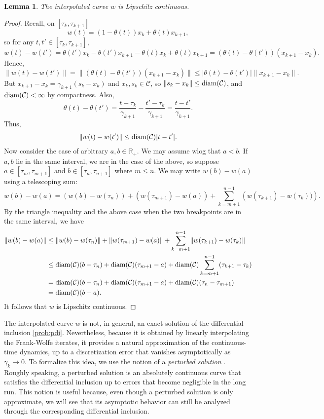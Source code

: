 \documentclass[pdflatex,sn-mathphys-num]{sn-jnl}%
\newcommand\diam{\mathop{\rm diam}}
\newcommand\R{\mathbb{R}}
\newcommand\C{\mathcal{C}}
\theoremstyle{thmstyleone}%
\newtheorem{lemma}[theorem]{Lemma}%
\theoremstyle{thmstyletwo}%
\theoremstyle{thmstylethree}%
\begin{document}
\begin{lemma} \label{lem:lipschitz-w}
  The interpolated curve $w$ is Lipschitz continuous.
\end{lemma}
\begin{proof}
  Recall, on $[\tau_k, \tau_{k+1}]$
  \[
    w(t) = (1-\theta(t))x_k + \theta(t)x_{k+1},
  \]
  so for any $t,t' \in [\tau_k,\tau_{k+1}]$,
  \[
    w(t) - w(t') = \theta(t')x_k - \theta(t')x_{k+1} - \theta(t) x_k + \theta(t)x_{k+1} = \left(\theta(t) - \theta(t')\right)(x_{k+1} - x_k).
  \]
  Hence,
  \[
    \lVert w(t) - w(t')\rVert = \lVert\left(\theta(t) - \theta(t')\right)(x_{k+1} - x_k)\rVert \leq \lvert\theta(t) - \theta(t')\rvert\lVert x_{k+1} - x_k\rVert.
  \]
  But $x_{k+1} - x_k = \gamma_{k+1}(s_k - x_k)$ and $x_k,s_k \in \C$, so $\lVert s_k - x_k\rVert \leq \diam(\C)$, and $\diam(\C) < \infty$ by compactness.
  Also,
  \[
    \theta(t) - \theta(t') = \frac{t - \tau_k}{\gamma_{k+1}} - \frac{t' - \tau_k}{\gamma_{k+1}} = \frac{t-t'}{\gamma_{k+1}}.
  \]
  Thus,
  \[
    \lVert w(t) - w(t')\rVert \leq \diam(\C)\lvert t - t'\rvert.
  \]
  Now consider the case of arbitrary $a,b \in \R_+$. We may assume wlog that $a < b$. If $a,b$ lie in the same interval, we are in the case of the above,
  so suppose $a \in [\tau_m,\tau_{m+1}]$ and $b \in [\tau_n, \tau_{n+1}]$ where $m \leq n$. We may write $w(b) - w(a)$ using a telescoping sum:
  \[
    w(b) - w(a) = \left(w(b) - w(\tau_n)\right) + \left(w(\tau_{m+1}) - w(a)\right) + \sum_{k=m+1}^{n-1}\left(w(\tau_{k+1}) - w(\tau_{k}))\right).
  \]
  By the triangle inequality and the above case when the two breakpoints are in the same interval, we have
  \begin{align*}
    \lVert w(b) - w(a)\rVert &\leq \lVert w(b) - w(\tau_n)\rVert + \lVert w(\tau_{m+1}) - w(a)\rVert + \sum_{k=m+1}^{n-1}\lVert w(\tau_{k+1}) - w(\tau_k)\rVert\\
                             &\leq \diam(\C)(b-\tau_n) + \diam(\C)(\tau_{m+1} - a) + \diam(\C)\sum_{k=m+1}^{n-1}(\tau_{k+1} - \tau_k)\\
                             &= \diam(\C)(b-\tau_n) + \diam(\C)(\tau_{m+1} - a) + \diam(\C)(\tau_n - \tau_{m+1})\\
                             &= \diam(\C)(b-a).
  \end{align*}
  It follows that $w$ is Lipschitz continuous.
\end{proof}

The interpolated curve $w$ is not, in general, an exact solution of the differential inclusion \eqref{prob:pdi}.
Nevertheless, because it is obtained by linearly interpolating the Frank-Wolfe iterates, it provides a natural
approximation of the continuous-time dynamics, up to a discretization error that vanishes asymptotically as
$\gamma_k\to 0$.
To formalize this idea, we use the notion of a \emph{perturbed solution} \cite[Definition~II]{Benaim2005}.
Roughly speaking, a perturbed solution is an absolutely continuous curve that satisfies the differential inclusion up to errors
that become negligible in the long run. This notion is useful because, even though a perturbed solution is only approximate,
we will see that its asymptotic behavior can still be analyzed through the corresponding differential inclusion.
\end{document}
